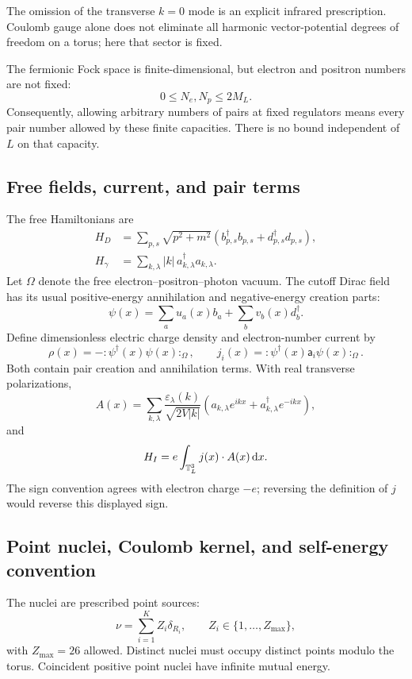 The omission of the transverse \(k=0\) mode is an explicit infrared
prescription. Coulomb gauge alone does not eliminate all harmonic
vector-potential degrees of freedom on a torus; here that sector is fixed.

The fermionic Fock space is finite-dimensional, but electron and positron
numbers are not fixed:
\begin{equation}
0\le N_e,N_p\le2M_L.
\end{equation}
Consequently, allowing arbitrary numbers of pairs at fixed regulators means
every pair number allowed by these finite capacities. There is no bound
independent of \(L\) on that capacity.

\subsection{Free fields, current, and pair terms}
The free Hamiltonians are
\begin{align}
H_D&=\sum_{p,s}\sqrt{p^2+m^2}
\left(b_{p,s}^\dagger b_{p,s}+d_{p,s}^\dagger d_{p,s}\right),\\
H_\gamma&=\sum_{k,\lambda}|k|\,a_{k,\lambda}^\dagger a_{k,\lambda}.
\end{align}
Let \(\Omega\) denote the free electron--positron--photon vacuum. The cutoff
Dirac field has its usual positive-energy annihilation and negative-energy
creation parts:
\begin{equation}
\psi(x)=\sum_a u_a(x)b_a+\sum_b v_b(x)d_b^\dagger.
\end{equation}
Define dimensionless electric charge density and electron-number current by
\begin{equation}
\rho(x)=-:\!\psi^\dagger(x)\psi(x)\!:_\Omega,\qquad
j_i(x)=:\!\psi^\dagger(x)\mathsf a_i\psi(x)\!:_\Omega.
\end{equation}
Both contain pair creation and annihilation terms.
With real transverse polarizations,
\begin{equation}
A(x)=\sum_{k,\lambda}
\frac{\varepsilon_\lambda(k)}{\sqrt{2V|k|}}
\left(a_{k,\lambda}e^{ikx}+a_{k,\lambda}^\dagger e^{-ikx}\right),
\end{equation}
and
\begin{equation}
H_I=e\int_{\mathbb T_L^3}j(x)\cdot A(x)\,\mathrm d x.
\end{equation}
The sign convention agrees with electron charge \(-e\); reversing the
definition of \(j\) would reverse this displayed sign.

\subsection{Point nuclei, Coulomb kernel, and self-energy convention}
The nuclei are prescribed point sources:
\begin{equation}
\nu=\sum_{i=1}^K Z_i\delta_{R_i},\qquad
Z_i\in\{1,\ldots,Z_{\max}\},
\end{equation}
with \(Z_{\max}=26\) allowed. Distinct nuclei must occupy distinct points
modulo the torus. Coincident positive point nuclei have infinite mutual energy.

